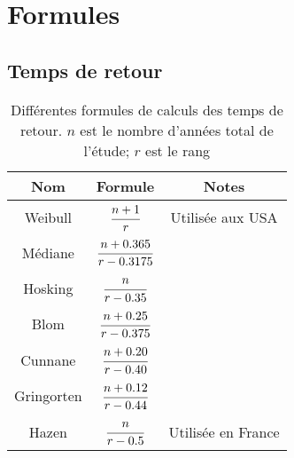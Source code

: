 \chapter{Formules}

\section{Temps de retour}
\begin{table}[H]
    \centering
    \begin{tabular}{ccc}
        \toprule
        \textbf{Nom} & \textbf{Formule}            & \textbf{Notes}     \\
        \toprule
        Weibull      & $\cfrac{n+1}{r}$            & Utilisée aux USA   \\
        \midrule
        Médiane      & $\cfrac{n+0.365}{r-0.3175}$ &                    \\
        \midrule
        Hosking      & $\cfrac{n}{r-0.35}$         &                    \\
        \midrule
        Blom         & $\cfrac{n+0.25}{r-0.375}$   &                    \\
        \midrule
        Cunnane      & $\cfrac{n+0.20}{r-0.40}$    &                    \\
        \midrule
        Gringorten   & $\cfrac{n+0.12}{r-0.44}$    &                    \\
        \arrayrulecolor{red} \midrule
        Hazen        & $\cfrac{n}{r-0.5}$          & Utilisée en France \\
        \bottomrule
    \end{tabular}
    \caption{Différentes formules de calculs des temps de retour. $n$ est le nombre d'années total de l'étude; $r$ est le rang}
    \label{tab:formuleTempsRetour}
\end{table}

